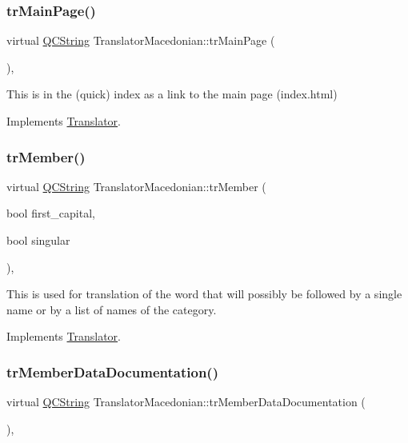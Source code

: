 \subsubsection{\texorpdfstring{trMainPage()}{trMainPage()}}
{\footnotesize\ttfamily virtual \mbox{\hyperlink{class_q_c_string}{Q\+C\+String}} Translator\+Macedonian\+::tr\+Main\+Page (\begin{DoxyParamCaption}{ }\end{DoxyParamCaption})\hspace{0.3cm}{\ttfamily [inline]}, {\ttfamily [virtual]}}

This is in the (quick) index as a link to the main page (index.\+html) 

Implements \mbox{\hyperlink{class_translator}{Translator}}.

\mbox{\label{class_translator_macedonian_ae51f7b3c1270249bfb69937c8f8a2f7d}} 
\subsubsection{\texorpdfstring{trMember()}{trMember()}}
{\footnotesize\ttfamily virtual \mbox{\hyperlink{class_q_c_string}{Q\+C\+String}} Translator\+Macedonian\+::tr\+Member (\begin{DoxyParamCaption}\item[{bool}]{first\+\_\+capital,  }\item[{bool}]{singular }\end{DoxyParamCaption})\hspace{0.3cm}{\ttfamily [inline]}, {\ttfamily [virtual]}}

This is used for translation of the word that will possibly be followed by a single name or by a list of names of the category. 

Implements \mbox{\hyperlink{class_translator}{Translator}}.

\mbox{\label{class_translator_macedonian_afb5ebc060fd9154af6c4557de63af0da}} 
\subsubsection{\texorpdfstring{trMemberDataDocumentation()}{trMemberDataDocumentation()}}
{\footnotesize\ttfamily virtual \mbox{\hyperlink{class_q_c_string}{Q\+C\+String}} Translator\+Macedonian\+::tr\+Member\+Data\+Documentation (\begin{DoxyParamCaption}{ }\end{DoxyParamCaption})\hspace{0.3cm}{\ttfamily [inline]}, {\ttfamily [virtual]}}

